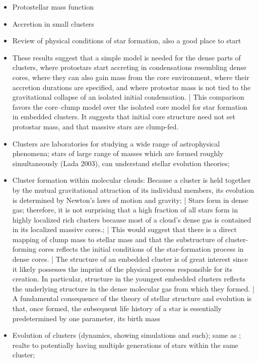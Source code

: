 \begin{itemize}
\item \citep{McKee:2010iw} Protostellar mass function
\item \citep{Bonnell:1997vta} Accretion in small clusters
\item \citep{Evans:1999gz} Review of physical conditions of star formation, also a good place to start
\item \citep{Myers:2011fy} These results suggest that a simple model is needed for the dense parts of clusters, where protostars start accreting in condensations resembling dense cores, where they can also gain mass from the core environment, where their accretion durations are specified, and where protostar mass is not tied to the gravitational collapse of an isolated initial condensation. | This comparison favors the core–clump model over the isolated core model for star formation in embedded clusters. It suggests that initial core structure need not set protostar mass, and that massive stars are clump-fed.
\item Clusters are laboratories for studying a wide range of astrophysical phenomena; stars of large range of masses which are formed roughly simultaneously (Lada 2003), can understand stellar evolution theories; 
\item \citep{Lada:2003il} Cluster formation within molecular clouds: Because a cluster is held together by the mutual gravitational attraction of its individual members, its evolution is determined by Newton's laws of motion and gravity; |
Stars form in dense gas; therefore, it is not surprising that a high fraction of all stars form in highly localized rich clusters because most of a cloud’s dense gas is contained in its localized massive cores.; |
This would suggest that there is a direct mapping of clump mass to stellar mass and that the substructure of cluster-forming cores reflects the initial conditions of the star-formation process in dense cores. |
The structure of an embedded cluster is of great interest since it likely possesses the imprint of the physical process responsible for its creation. In particular, structure in the youngest embedded clusters reflects the underlying structure in the dense molecular gas from which they formed. | A fundamental consequence of the theory of stellar structure and evolution is that, once formed, the subsequent life history of a star is essentially predetermined by one parameter, its birth mass
\item \citep{Bate:2003cv} Evolution of clusters (dynamics, showing simulations and such); same as \citep{Bonnell:2003iw}; realte to potentially having multiple generations of stars within the same cluster; \citep{Allen:2007wqa}

\end{itemize}
